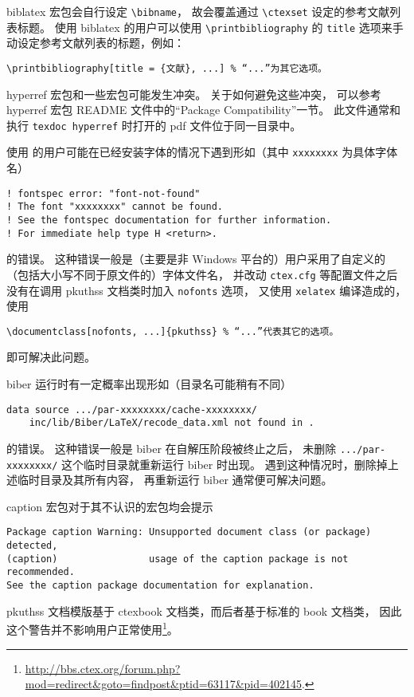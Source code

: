 biblatex\supercite{biblatex} 宏包会自行设定 \verb|\bibname|，
故会覆盖通过 \verb|\ctexset| 设定的参考文献列表标题。
使用 biblatex 的用户可以使用 \verb|\printbibliography| 的
\verb|title| 选项来手动设定参考文献列表的标题，例如：
\begin{Verbatim}[frame = single]
\printbibliography[title = {文献}, ...] % “...”为其它选项。
\end{Verbatim}

hyperref\supercite{hyperref} 宏包和一些宏包可能发生冲突。
关于如何避免这些冲突，
可以参考 hyperref 宏包 README 文件中的“Package Compatibility”一节。
此文件通常和执行 \verb|texdoc hyperref|
时打开的 pdf 文件位于同一目录中。

使用  的用户可能在已经安装字体的情况下遇到形如（其中
\verb|xxxxxxxx| 为具体字体名）
\begin{Verbatim}[frame = single, fontsize = {\small}]
! fontspec error: "font-not-found"
! The font "xxxxxxxx" cannot be found.
! See the fontspec documentation for further information.
! For immediate help type H <return>.
\end{Verbatim}
的错误。
这种错误一般是（主要是非 Windows 平台的）用户采用了自定义的
（包括大小写不同于原文件的）字体文件名，
并改动 \verb|ctex.cfg| 等配置文件之后没有在调用
pkuthss 文档类时加入 \verb|nofonts| 选项，
又使用 \verb|xelatex| 编译造成的，使用
\begin{Verbatim}[frame = single]
\documentclass[nofonts, ...]{pkuthss} % “...”代表其它的选项。
\end{Verbatim}
即可解决此问题。

biber 运行时有一定概率出现形如（目录名可能稍有不同）
\begin{Verbatim}[frame = single, fontsize = {\small}]
data source .../par-xxxxxxxx/cache-xxxxxxxx/
	inc/lib/Biber/LaTeX/recode_data.xml not found in .
\end{Verbatim}
的错误。
这种错误一般是 biber 在自解压阶段被终止之后，
未删除 \verb|.../par-xxxxxxxx/| 这个临时目录就重新运行 biber 时出现。
遇到这种情况时，删除掉上述临时目录及其所有内容，
再重新运行 biber 通常便可解决问题。

caption\supercite{caption} 宏包对于其不认识的宏包均会提示
\begin{Verbatim}[frame = single, fontsize = {\small}]
Package caption Warning: Unsupported document class (or package) detected,
(caption)                usage of the caption package is not recommended.
See the caption package documentation for explanation.
\end{Verbatim}
pkuthss 文档模版基于 ctexbook 文档类，而后者基于标准的 book 文档类，
因此这个警告并不影响用户正常使用\footnote{%
	\url{http://bbs.ctex.org/forum.php?mod=redirect&goto=findpost&ptid=63117&pid=402145}.%
}。

